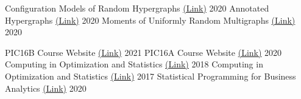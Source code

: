 


\begin{cvhonors}
    \cvhonorminor
        {}
        {Configuration Models of Random Hypergraphs} %
        {\href{https://github.com/PhilChodrow/hypergraph}{(Link)}} %
        {2020} %
    \cvhonorminor
        {} 
        {Annotated Hypergraphs} %
        {\href{https://github.com/PhilChodrow/annotated_hypergraphs}{(Link)}} %
        {2020} %
    \cvhonorminor
        {} %
        {Moments of Uniformly Random Multigraphs} %
        {\href{https://github.com/PhilChodrow/multigraph_moments}{(Link)}} %
        {2020} %
\end{cvhonors}


\begin{cvhonors}
    \cvhonorminor
        {}
        {PIC16B Course Website}
        {\href{https://philchodrow.github.io/PIC16B/}{(Link)}}
        {2021} 
    \cvhonorminor
        {}
        {PIC16A Course Website}
        {\href{https://philchodrow.github.io/PIC16A/}{(Link)}}
        {2020}
    \cvhonorminor
        {}
        {Computing in Optimization and Statistics} %
        {\href{https://philchodrow.github.io/cos_2018/}{(Link)}} %
        {2018} %
    \cvhonorminor
        {}
        {Computing in Optimization and Statistics} %
        {\href{https://philchodrow.github.io/cos_2017/}{(Link)}} %
        {2017} %
    \cvhonorminor
        {}
        {Statistical Programming for Business Analytics} %
        {\href{https://philchodrow.github.io/mban_orientation/}{(Link)}} %
        {2020} %
\end{cvhonors}
